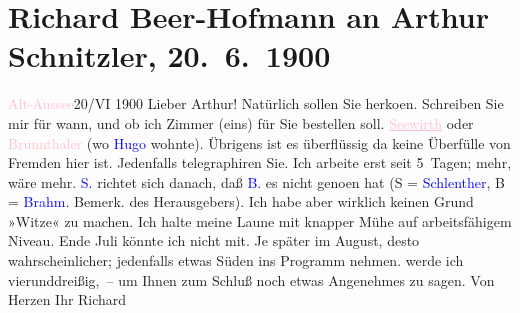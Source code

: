 

               \section[Richard Beer-Hofmann an Arthur Schnitzler, 20. 6. 1900]{ Richard Beer-Hofmann an Arthur Schnitzler, 20. 6. 1900}\nopagebreak{}\rehead{ }\normalsize\beginnumbering{} \toendnotes[C]{\smallbreak\pagebreak[2]} 
\toendnotes[C]{\smallbreak}\pstart
           \raggedleft{}{\pb}\textcolor{pink}{Alt-Aussee}{}\ledrightnote{\textcolor{pink}{Altaussee}}{ }20/VI 1900\pend
           \pstart
           Lieber Arthur! Natürlich sollen Sie herko{\geminationm}en. Schreiben Sie mir für wann, und ob ich Zimmer
               (eins) für Sie bestellen soll. \textcolor{pink}{\uline{Seewirth}}{}\ledrightnote{\textcolor{pink}{Seewirt}} oder \textcolor{pink}{Brunnthaler}{}\ledrightnote{\textcolor{pink}{Gasthaus Brunnthaler}} (wo \textcolor{blue}{Hugo}{}\ledrightnote{\textcolor{blue}{Hugo von Hofmannsthal}} wohnte). Übrigens ist es überflüssig da keine Überfülle
               von Fremden hier ist. Jedenfalls telegraphiren Sie. Ich arbeite erst seit 5 Tagen;
               mehr, wäre mehr. \textcolor{blue}{S.}{}\ledrightnote{\textcolor{blue}{Paul Schlenther}} richtet sich danach, daß \textcolor{blue}{B.}{}\ledrightnote{\textcolor{blue}{Otto Brahm}} es nicht geno{\geminationm}en
               hat (S = \textcolor{blue}{Schlenther}{}\ledrightnote{\textcolor{blue}{Paul Schlenther}}, B = \textcolor{blue}{Brahm}{}\ledrightnote{\textcolor{blue}{Otto Brahm}}. Bemerk. des Herausgebers). Ich habe aber wirklich keinen
               Grund »Witze« zu machen. Ich halte meine Laune mit knapper Mühe auf arbeits{\pb}fähigem Niveau. Ende
                  Juli könnte ich nicht mit. Je später im August, desto wahrscheinlicher;
               jedenfalls etwas Süden ins Programm nehmen. \label{K_L01046_1v}\label{K_L01046_1h} werde ich vierunddreißig, –
               um Ihnen zum Schluß noch etwas Angenehmes zu sagen.\pend
           \pstart Von Herzen Ihr \spacefill\mbox{Richard}\pend{}\endnumbering{}  
      